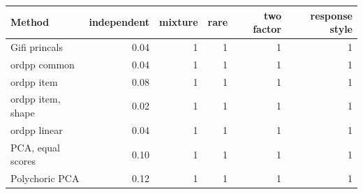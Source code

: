 \begin{tabular}{lrrrrr}
\toprule
Method & independent & mixture & rare & two factor & response style \\
\midrule
Gifi princals & 0.04 & 1 & 1 & 1 & 1 \\
ordpp common & 0.04 & 1 & 1 & 1 & 1 \\
ordpp item & 0.08 & 1 & 1 & 1 & 1 \\
ordpp item, shape & 0.02 & 1 & 1 & 1 & 1 \\
ordpp linear & 0.04 & 1 & 1 & 1 & 1 \\
PCA, equal scores & 0.10 & 1 & 1 & 1 & 1 \\
Polychoric PCA & 0.12 & 1 & 1 & 1 & 1 \\
\bottomrule
\end{tabular}
